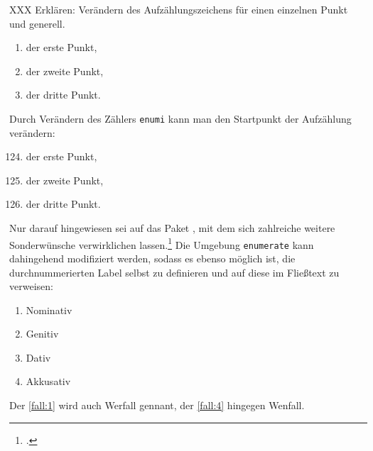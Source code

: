 XXX Erklären: Verändern des Aufzählungszeichens für einen einzelnen Punkt und generell.



\begin{lfgwexample}{}
\begin{enumerate}
 \item der erste Punkt,
 \item der zweite Punkt,
 \item der dritte Punkt.
\end{enumerate} 
\end{lfgwexample}

Durch Verändern des Zählers \lstinline/enumi/ kann man den Startpunkt der 
Aufzählung verändern:

\begin{lfgwexample}{}
\begin{enumerate}
 \setcounter{enumi}{123}
 \item der erste Punkt,
 \item der zweite Punkt,
 \item der dritte Punkt.
\end{enumerate} 
\end{lfgwexample}



Nur darauf hingewiesen sei auf das Paket , mit dem sich zahlreiche 
weitere Sonderwünsche verwirklichen lassen.\footcite[304\psqq]{voss:einfuehrung}
Die Umgebung \lstinline/enumerate/  kann dahingehend modifiziert werden, sodass es ebenso möglich ist, 
die durchnummerierten Label selbst zu definieren
und auf diese im Fließtext zu verweisen:

\begin{lfgwexample}{}
\begin{enumerate}[%
  label={\bfseries \arabic{*}. Fall:\ },
  ref={\arabic{*}. Fall}]
\item Nominativ \label{fall:1}
\item Genitiv\label{fall:2}
\item Dativ\label{fall:3}
\item Akkusativ\label{fall:4}
\end{enumerate}
Der \ref{fall:1} wird auch Werfall gennant,
der \ref{fall:4} hingegen Wenfall.
\end{lfgwexample}

